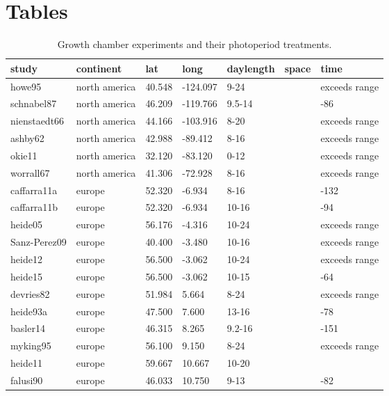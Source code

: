 \documentclass{article}
\begin{document}
\section* {Tables}
\begin{table}[ht]
\centering
\caption{Growth chamber experiments and their photoperiod treatments.} 
\label{table:phototreats}
\begin{tabular}{|p{}|p{}|p{}|p{}|p{}|p{}|p{}|}
  \hline
study & continent & lat & long & daylength & space & time \\ 
  \hline
howe95 & north america & 40.548 & -124.097 & 9-24 &  & exceeds range \\ 
  schnabel87 & north america & 46.209 & -119.766 & 9.5-14 &  & -86 \\ 
  nienstaedt66 & north america & 44.166 & -103.916 & 8-20 &  & exceeds range \\ 
  ashby62 & north america & 42.988 & -89.412 & 8-16 &  & exceeds range \\ 
  okie11 & north america & 32.120 & -83.120 & 0-12 &  & exceeds range \\ 
  worrall67 & north america & 41.306 & -72.928 & 8-16 &  & exceeds range \\ 
  caffarra11a & europe & 52.320 & -6.934 & 8-16 &  & -132 \\ 
  caffarra11b & europe & 52.320 & -6.934 & 10-16 &  & -94 \\ 
  heide05 & europe & 56.176 & -4.316 & 10-24 &  & exceeds range \\ 
  Sanz-Perez09 & europe & 40.400 & -3.480 & 10-16 &  & exceeds range \\ 
  heide12 & europe & 56.500 & -3.062 & 10-24 &  & exceeds range \\ 
  heide15 & europe & 56.500 & -3.062 & 10-15 &  & -64 \\ 
  devries82 & europe & 51.984 & 5.664 & 8-24 &  & exceeds range \\ 
  heide93a & europe & 47.500 & 7.600 & 13-16 &  & -78 \\ 
  basler14 & europe & 46.315 & 8.265 & 9.2-16 &  & -151 \\ 
  myking95 & europe & 56.100 & 9.150 & 8-24 &  & exceeds range \\ 
  heide11 & europe & 59.667 & 10.667 & 10-20 &  &  \\ 
  falusi90 & europe & 46.033 & 10.750 & 9-13 &  & -82 \\ 

\end{tabular}
\end{table}
\end{document}
